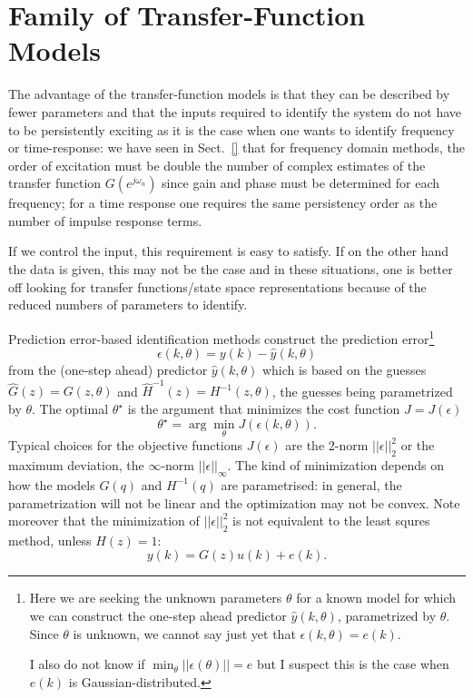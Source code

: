 \section{Family of Transfer-Function Models}
\label{sec:family-tf-models}

The advantage of the transfer-function models is that they can be described by fewer parameters and that the inputs required to identify the system do not have to be persistently exciting as it is the case when one wants to identify frequency or time-response: we have seen in Sect.~\ref{} that for frequency domain methods, the order of excitation must be double the number of complex estimates of the transfer function $G(e^{j\omega_n})$ since gain and phase must be determined for each frequency; for a time response one requires the same persistency order as the number of impulse response terms.

If we control the input, this requirement is easy to satisfy. If on the other hand the data is given, this may not be the case and in these situations, one is better off looking for transfer functions/state space representations because of the reduced numbers of parameters to identify.

Prediction error-based identification methods construct the prediction error\footnote{Here we are seeking the unknown parameters $\theta$ for a known model for which we can construct the one-step ahead predictor $\hat{y}(k,\theta)$, parametrized by $\theta$. Since $\theta$ is unknown, we cannot say just yet that $\epsilon(k,\theta) = e(k)$.

  I also do not know if $\min_\theta ||\epsilon(\theta)|| = e$ but I suspect this is the case when $e(k)$ is Gaussian-distributed.}
\begin{equation}
  \label{eq:prediction-error-parametrized}
  \epsilon(k,\theta) = y(k) - \hat{y}(k,\theta)
\end{equation}
from the (one-step ahead) predictor $\hat{y}(k,\theta)$ which is based on the guesses $\hat{G}(z)=G(z,\theta)$ and $\hat{H}^{-1}(z)=H^{-1}(z,\theta)$, the guesses being parametrized by $\theta$. The optimal $\theta^\star$ is the argument that minimizes the cost function $J=J(\epsilon)$
\begin{equation*}
  \theta^\star = \arg \min_\theta J(\epsilon(k,\theta)).
\end{equation*}
Typical choices for the objective functions $J(\epsilon)$ are the 2-norm $||\epsilon||_2^2$ or the maximum deviation, the $\infty$-norm $||\epsilon||_\infty$. The kind of minimization depends on how the models $G(q)$ and $H^{-1}(q)$ are parametrised: in general, the parametrization will not be linear and the optimization may not be convex. Note moreover that the minimization of $||\epsilon||_2^2$ is not equivalent to the least squres method, unless  $H(z)=1$:
\begin{equation*}
  y(k) = G(z)u(k) + e(k).
\end{equation*}

